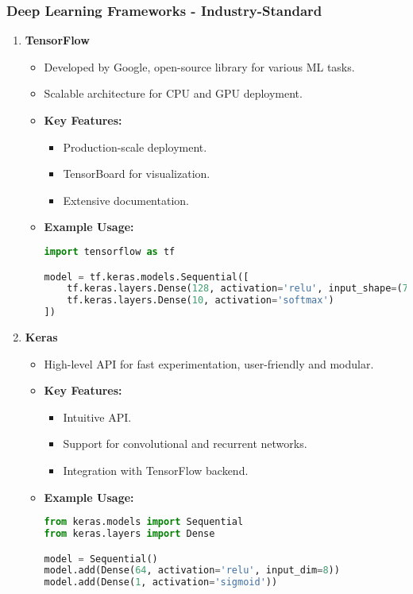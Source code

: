 \documentclass[aspectratio=169]{beamer}
\begin{document}
\begin{frame}[fragile]
    \frametitle{Deep Learning Frameworks - Industry-Standard}
    \begin{enumerate}
        \item \textbf{TensorFlow}
            \begin{itemize}
                \item Developed by Google, open-source library for various ML tasks.
                \item Scalable architecture for CPU and GPU deployment.
                \item \textbf{Key Features:}
                    \begin{itemize}
                        \item Production-scale deployment.
                        \item TensorBoard for visualization.
                        \item Extensive documentation.
                    \end{itemize}
                \item \textbf{Example Usage:}
                \begin{lstlisting}[language=Python]
import tensorflow as tf

model = tf.keras.models.Sequential([
    tf.keras.layers.Dense(128, activation='relu', input_shape=(784,)),
    tf.keras.layers.Dense(10, activation='softmax')
])
                \end{lstlisting}
            \end{itemize}
        
        \item \textbf{Keras}
            \begin{itemize}
                \item High-level API for fast experimentation, user-friendly and modular.
                \item \textbf{Key Features:}
                    \begin{itemize}
                        \item Intuitive API.
                        \item Support for convolutional and recurrent networks.
                        \item Integration with TensorFlow backend.
                    \end{itemize}
                \item \textbf{Example Usage:}
                \begin{lstlisting}[language=Python]
from keras.models import Sequential
from keras.layers import Dense

model = Sequential()
model.add(Dense(64, activation='relu', input_dim=8))
model.add(Dense(1, activation='sigmoid'))
                \end{lstlisting}
            \end{itemize}
    \end{enumerate}
\end{frame}
\end{document}
